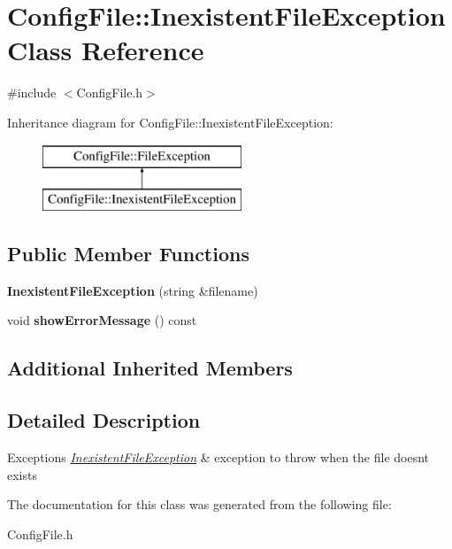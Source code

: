 \hypertarget{class_config_file_1_1_inexistent_file_exception}{}\section{Config\+File\+:\+:Inexistent\+File\+Exception Class Reference}
\label{class_config_file_1_1_inexistent_file_exception}


{\ttfamily \#include $<$Config\+File.\+h$>$}

Inheritance diagram for Config\+File\+:\+:Inexistent\+File\+Exception\+:\begin{figure}[H]
\begin{center}
\leavevmode
\includegraphics[height=2.000000cm]{class_config_file_1_1_inexistent_file_exception}
\end{center}
\end{figure}
\subsection*{Public Member Functions}
\begin{DoxyCompactItemize}
\item 
\hypertarget{class_config_file_1_1_inexistent_file_exception_a83a4ea384ce2811c689844b5b9bc83dd}{}{\bfseries Inexistent\+File\+Exception} (string \&filename)\label{class_config_file_1_1_inexistent_file_exception_a83a4ea384ce2811c689844b5b9bc83dd}

\item 
\hypertarget{class_config_file_1_1_inexistent_file_exception_a1ef632e719a76c22ffb10d5c402551c5}{}void {\bfseries show\+Error\+Message} () const \label{class_config_file_1_1_inexistent_file_exception_a1ef632e719a76c22ffb10d5c402551c5}

\end{DoxyCompactItemize}
\subsection*{Additional Inherited Members}


\subsection{Detailed Description}

\begin{DoxyExceptions}{Exceptions}
{\em \hyperlink{class_config_file_1_1_inexistent_file_exception}{Inexistent\+File\+Exception}} & exception to throw when the file doesn\textquotesingle{}t exists \\
\hline
\end{DoxyExceptions}


The documentation for this class was generated from the following file\+:\begin{DoxyCompactItemize}
\item 
Config\+File.\+h\end{DoxyCompactItemize}
